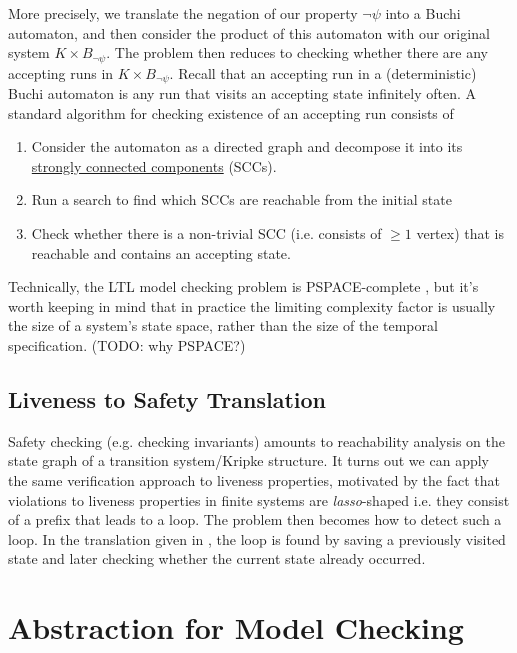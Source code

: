 \documentclass[10pt,a4paper]{article}
\begin{document}
More precisely, we translate the negation of our property $\neg \psi$ into a Buchi automaton, and then consider the product of this automaton with our original system $K \times B_{\neg \psi}$. The problem then reduces to checking whether there are any accepting runs in $K \times B_{\neg \psi}$. Recall that an accepting run in a (deterministic) Buchi automaton is any run that visits an accepting state infinitely often. A standard algorithm for checking existence of an accepting run consists of
\begin{enumerate}
    \item Consider the automaton as a directed graph and decompose it into its \href{https://will62794.github.io/my-notes/notes/Strongly_Connected_Components/Strongly_Connected_Components.html}{strongly connected components} (SCCs).
    \item Run a search to find which SCCs are reachable from the initial state
    \item Check whether there is a non-trivial SCC (i.e. consists of $\geq 1$ vertex) that is reachable and contains an accepting state.
\end{enumerate}

Technically, the LTL model checking problem is PSPACE-complete \cite{1985sistlaclarke}, but it's worth keeping in mind that in practice the limiting complexity factor is usually the size of a system's state space, rather than the size of the temporal specification. (TODO: why PSPACE?)

\subsection{Liveness to Safety Translation}

Safety checking (e.g. checking invariants) amounts to reachability analysis on the state graph of a transition system/Kripke structure. It turns out we can apply the same verification approach to liveness properties, motivated by the fact that violations to liveness properties in finite systems are \textit{lasso}-shaped i.e. they consist of a prefix that leads to a loop. The problem then becomes how to detect such a loop. In the translation given in \cite{2002bierelivenessassafety}, the loop is found by saving a previously visited state and later checking whether the current state already occurred.


\section{Abstraction for Model Checking}
\end{document}
